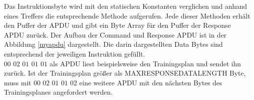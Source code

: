 
Das Instruktionsbyte wird mit den statischen Konstanten verglichen und anhand eines Treffers die entsprechende Methode aufgerufen. Jede dieser Methoden erhält den Puffer der APDU und gibt ein Byte Array für den Puffer der Response APDU zurück.
Der Aufbau der Command und Response APDU ist in der Abbildung \ref{myapdu} dargestellt.
Die darin dargestellten Data Bytes sind entsprechend der jeweiligen Instruktion gefüllt.\\
$00$ $02$ $01$ $01$ $01$ als APDU liest beispielsweise den Trainingsplan und sendet ihn zurück. Ist der Trainingsplan größer als MAXRESPONSEDATALENGTH Byte, muss mit $00$ $02$ $01$ $01$ $02$ eine weitere APDU mit den nächsten Bytes des Trainingsplanes angefordert werden.
